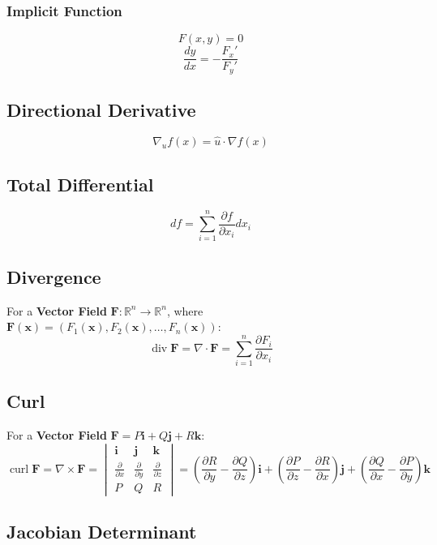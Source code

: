 \documentclass{article}
\begin{document}
\subsubsection{Implicit Function}

\[
    F(x, y) = 0
\]
\[
    \frac{dy}{dx} = -\frac{F_x'}{F_y'}
\]

\subsection{Directional Derivative}

\[
    \nabla_u f(x) = \hat{u} \cdot \nabla f(x)
\]

\subsection{Total Differential}

\[
    df = \sum_{i=1}^n \frac{\partial f}{\partial x_i} dx_i
\]

\subsection{Divergence}
For a \textbf{Vector Field} $\mathbf{F}: \mathbb{R}^n \to \mathbb{R}^n$, where $\mathbf{F}(\mathbf{x}) = (F_1(\mathbf{x}), F_2(\mathbf{x}), \dots, F_n(\mathbf{x}))$:
\[
    \operatorname{div} \mathbf{F} = \nabla \cdot \mathbf{F} = \sum_{i=1}^n \frac{\partial F_i}{\partial x_i}
\]

\subsection{Curl}
For a \textbf{Vector Field} $\mathbf{F} = P\mathbf{i} + Q\mathbf{j} + R\mathbf{k}$:
\[
    \operatorname{curl} \mathbf{F} = \nabla \times \mathbf{F} =
    \begin{vmatrix}
        \mathbf{i} & \mathbf{j} & \mathbf{k} \\
        \frac{\partial}{\partial x} & \frac{\partial}{\partial y} & \frac{\partial}{\partial z} \\
        P & Q & R
    \end{vmatrix}
    = \left(\frac{\partial R}{\partial y} - \frac{\partial Q}{\partial z}\right)\mathbf{i} + \left(\frac{\partial P}{\partial z} - \frac{\partial R}{\partial x}\right)\mathbf{j} + \left(\frac{\partial Q}{\partial x} - \frac{\partial P}{\partial y}\right)\mathbf{k}
\]

\subsection{Jacobian Determinant}
\end{document}
